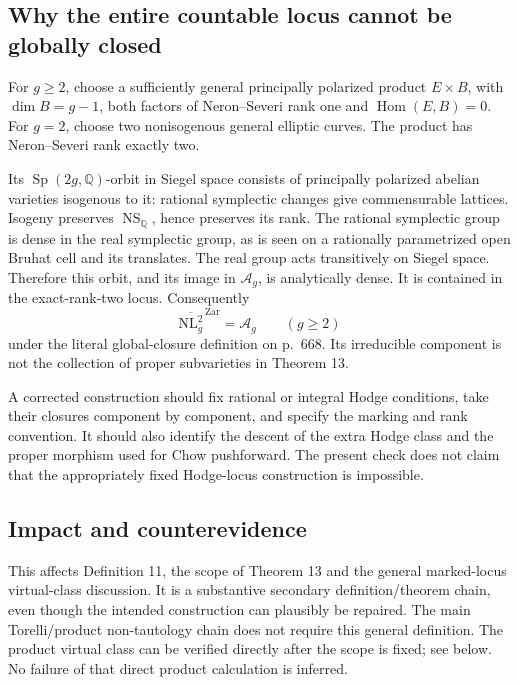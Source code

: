 \documentclass[10pt]{article}
\begin{document}
\subsection*{Why the entire countable locus cannot be globally closed}
For \(g\ge2\), choose a sufficiently general principally polarized product \(E\times B\), with \(\dim B=g-1\), both factors of Neron–Severi rank one and \(\operatorname{Hom}(E,B)=0\). For \(g=2\), choose two nonisogenous general elliptic curves. The product has Neron–Severi rank exactly two.\par
Its \(\operatorname{Sp}(2g,\mathbb Q)\)-orbit in Siegel space consists of principally polarized abelian varieties isogenous to it: rational symplectic changes give commensurable lattices. Isogeny preserves \(\operatorname{NS}_\mathbb Q\), hence preserves its rank. The rational symplectic group is dense in the real symplectic group, as is seen on a rationally parametrized open Bruhat cell and its translates. The real group acts transitively on Siegel space. Therefore this orbit, and its image in \(\mathcal A_g\), is analytically dense. It is contained in the exact-rank-two locus. Consequently \[\overline{\mathrm{NL}_g^2}^{\,\mathrm{Zar}}=\mathcal A_g
                    \qquad(g\ge2)\] under the literal global-closure definition on p. 668. Its irreducible component is not the collection of proper subvarieties in Theorem 13.\par
A corrected construction should fix rational or integral Hodge conditions, take their closures component by component, and specify the marking and rank convention. It should also identify the descent of the extra Hodge class and the proper morphism used for Chow pushforward. The present check does not claim that the appropriately fixed Hodge-locus construction is impossible.\par
\subsection*{Impact and counterevidence}
This affects Definition 11, the scope of Theorem 13 and the general marked-locus virtual-class discussion. It is a substantive secondary definition/theorem chain, even though the intended construction can plausibly be repaired. The main Torelli/product non-tautology chain does not require this general definition. The product virtual class can be verified directly after the scope is fixed; see below. No failure of that direct product calculation is inferred.\par
\end{document}
